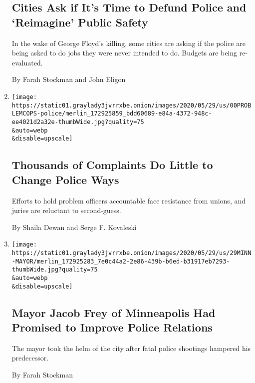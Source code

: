 \begin{enumerate}
{  \subsection{Cities Ask if It's Time to Defund Police and `Reimagine'
  Public
  Safety}\label{cities-ask-if-its-time-to-defund-police-and-reimagine-public-safety}}

  In the wake of George Floyd's killing, some cities are asking if the
  police are being asked to do jobs they were never intended to do.
  Budgets are being re-evaluated.

  By Farah Stockman and John Eligon
\item
  \href{/2020/05/30/us/derek-chauvin-george-floyd.html}{}

  \texttt{[image: https://static01.graylady3jvrrxbe.onion/images/2020/05/29/us/00PROBLEMCOPS-police/merlin\_172925859\_bdd60689-e84a-4372-948c-ee4021d2a32e-thumbWide.jpg?quality=75\\\&auto=webp\\\&disable=upscale]}

  \hypertarget{thousands-of-complaints-do-little-to-change-police-ways}{%
  \subsection{Thousands of Complaints Do Little to Change Police
  Ways}\label{thousands-of-complaints-do-little-to-change-police-ways}}

  Efforts to hold problem officers accountable face resistance from
  unions, and juries are reluctant to second-guess.

  By Shaila Dewan and Serge F. Kovaleski
\item
  \href{/2020/05/29/us/jacob-frey-minneapolis-george-floyd.html}{}

  \texttt{[image: https://static01.graylady3jvrrxbe.onion/images/2020/05/29/us/29MINN-MAYOR/merlin\_172925283\_7e0c44a2-2e86-439b-b6ed-b31917eb7293-thumbWide.jpg?quality=75\\\&auto=webp\\\&disable=upscale]}

  \hypertarget{mayor-jacob-frey-of-minneapolis-had-promised-to-improve-police-relations}{%
  \subsection{Mayor Jacob Frey of Minneapolis Had Promised to Improve
  Police
  Relations}\label{mayor-jacob-frey-of-minneapolis-had-promised-to-improve-police-relations}}

  The mayor took the helm of the city after fatal police shootings
  hampered his predecessor.

  By Farah Stockman
\end{enumerate}

